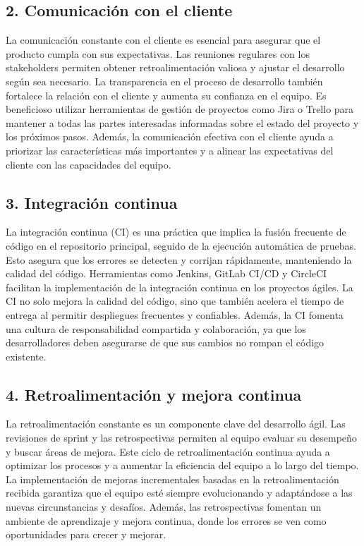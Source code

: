 \documentclass[12pt]{article}
\begin{document}
\subsection*{2. Comunicación con el cliente}
La comunicación constante con el cliente es esencial para asegurar que el producto cumpla con sus expectativas. Las reuniones regulares con los stakeholders permiten obtener retroalimentación valiosa y ajustar el desarrollo según sea necesario. La transparencia en el proceso de desarrollo también fortalece la relación con el cliente y aumenta su confianza en el equipo. Es beneficioso utilizar herramientas de gestión de proyectos como Jira o Trello para mantener a todas las partes interesadas informadas sobre el estado del proyecto y los próximos pasos. Además, la comunicación efectiva con el cliente ayuda a priorizar las características más importantes y a alinear las expectativas del cliente con las capacidades del equipo.

\subsection*{3. Integración continua}
La integración continua (CI) es una práctica que implica la fusión frecuente de código en el repositorio principal, seguido de la ejecución automática de pruebas. Esto asegura que los errores se detecten y corrijan rápidamente, manteniendo la calidad del código. Herramientas como Jenkins, GitLab CI/CD y CircleCI facilitan la implementación de la integración continua en los proyectos ágiles. La CI no solo mejora la calidad del código, sino que también acelera el tiempo de entrega al permitir despliegues frecuentes y confiables. Además, la CI fomenta una cultura de responsabilidad compartida y colaboración, ya que los desarrolladores deben asegurarse de que sus cambios no rompan el código existente.

\subsection*{4. Retroalimentación y mejora continua}
La retroalimentación constante es un componente clave del desarrollo ágil. Las revisiones de sprint y las retrospectivas permiten al equipo evaluar su desempeño y buscar áreas de mejora. Este ciclo de retroalimentación continua ayuda a optimizar los procesos y a aumentar la eficiencia del equipo a lo largo del tiempo. La implementación de mejoras incrementales basadas en la retroalimentación recibida garantiza que el equipo esté siempre evolucionando y adaptándose a las nuevas circunstancias y desafíos. Además, las retrospectivas fomentan un ambiente de aprendizaje y mejora continua, donde los errores se ven como oportunidades para crecer y mejorar.
\end{document}
